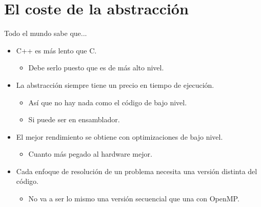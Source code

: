 \section{El coste de la abstracción}

\begin{frame}[t]{Todo el mundo sabe que...}
\begin{itemize}
  \pause
  \item C++ es más lento que C.
    \begin{itemize}
      \item Debe serlo puesto que es de más alto nivel.
    \end{itemize}

  \vfill\pause
  \item La abstracción siempre tiene un precio en tiempo de ejecución.
    \begin{itemize}
      \item Así que no hay nada como el código de bajo nivel.
      \item Si puede ser en ensamblador.
    \end{itemize}

  \vfill\pause
  \item El mejor rendimiento se obtiene con optimizaciones de bajo nivel.
    \begin{itemize}
      \item Cuanto más pegado al hardware mejor.
    \end{itemize}

  \vfill\pause
  \item Cada enfoque de resolución de un problema necesita una versión distinta
        del código.
    \begin{itemize}
      \item No va a ser lo mismo una versión secuencial que una con OpenMP.
    \end{itemize}
\end{itemize}
\end{frame}

